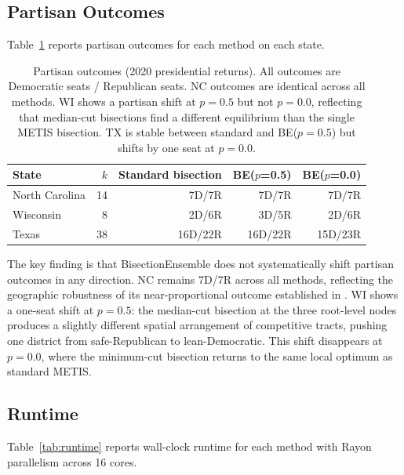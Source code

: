 \subsection{Partisan Outcomes}
\label{sec:results:partisan}

Table~\ref{tab:partisan} reports partisan outcomes for each method on each state.

\begin{table}[h]
\centering
\begin{tabular}{lrrrr}
\toprule
State & $k$ & Standard bisection & BE($p$=0.5) & BE($p$=0.0) \\
\midrule
North Carolina & 14 & 7D/7R & 7D/7R & 7D/7R \\
Wisconsin      & 8  & 2D/6R & 3D/5R & 2D/6R \\
Texas          & 38 & 16D/22R & 16D/22R & 15D/23R \\
\bottomrule
\end{tabular}
\caption{Partisan outcomes (2020 presidential returns). All outcomes are
  Democratic seats / Republican seats. NC outcomes are identical across all
  methods. WI shows a partisan shift at $p=0.5$ but not $p=0.0$, reflecting
  that median-cut bisections find a different equilibrium than the single METIS
  bisection. TX is stable between standard and BE($p=0.5$) but shifts by one seat
  at $p=0.0$.}
\label{tab:partisan}
\end{table}

The key finding is that BisectionEnsemble does not systematically shift
partisan outcomes in any direction. NC remains 7D/7R across all methods,
reflecting the geographic robustness of its near-proportional outcome
established in \citet{dellaLibera2026apportion}. WI shows a one-seat shift
at $p=0.5$: the median-cut bisection at the three root-level nodes produces
a slightly different spatial arrangement of competitive tracts, pushing one
district from safe-Republican to lean-Democratic. This shift disappears at
$p=0.0$, where the minimum-cut bisection returns to the same local optimum
as standard METIS.

\subsection{Runtime}
\label{sec:results:runtime}

Table~\ref{tab:runtime} reports wall-clock runtime for each method with
Rayon parallelism across 16 cores.

